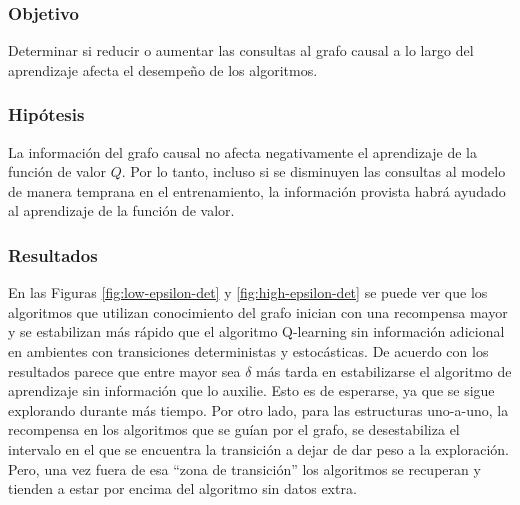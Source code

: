 \subsubsection{Objetivo}

Determinar si reducir o aumentar las consultas al grafo causal a lo largo del aprendizaje afecta el desempeño
de los algoritmos.

\subsubsection{Hipótesis}

La información del grafo causal no afecta negativamente 
el aprendizaje de la función de valor $Q$. Por lo tanto, incluso si se disminuyen las consultas al modelo de manera temprana en el entrenamiento, la información provista habrá
ayudado al aprendizaje de la función de valor.

\subsubsection{Resultados}

En las Figuras \ref{fig:low-epsilon-det} y \ref{fig:high-epsilon-det} se puede ver que los algoritmos que utilizan conocimiento del grafo inician con una recompensa mayor y se estabilizan más rápido que el algoritmo Q-learning
sin información adicional en ambientes con transiciones deterministas y estocásticas.
De acuerdo con los resultados parece que 
entre mayor sea $\delta$ más tarda en estabilizarse
el algoritmo de aprendizaje sin información que lo auxilie. Esto es de esperarse, ya que se sigue explorando durante más tiempo. 
Por otro lado, para las estructuras uno-a-uno, la recompensa en los algoritmos que se guían por el grafo, se desestabiliza el intervalo en el que se encuentra la transición a dejar de dar peso a
la exploración. Pero, una vez fuera de esa ``zona de transición'' los
algoritmos se recuperan y tienden a estar por encima del algoritmo sin datos 
extra.

\newpage

